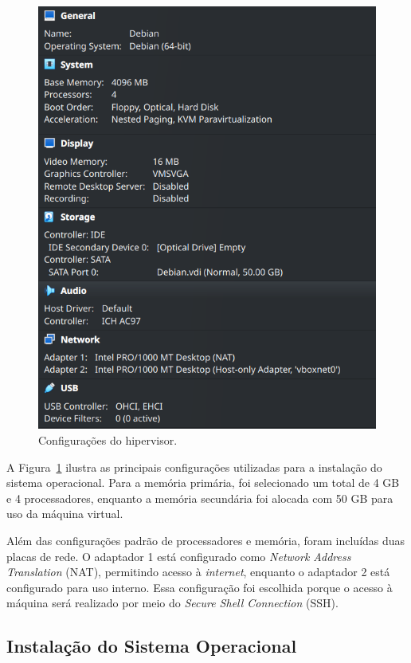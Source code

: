 \documentclass[
	12pt,				%
	oneside,   	        %
	a4paper,			%
	english,			%
	french,				%
	spanish,			%
	brazil,				%
	]{pacotes/abntex2}
\begin{document}
\begin{figure}[H]
  \centering
  \includegraphics[scale=0.7]{figuras/vm.png}
  \caption{Configurações do hipervisor.}
  \label{fig:vm}
\end{figure}

A Figura~\ref{fig:vm} ilustra as principais configurações utilizadas para a instalação do sistema operacional. Para a memória primária, foi selecionado um total de 4 GB e 4 processadores, enquanto a memória secundária foi alocada com 50 GB para uso da máquina virtual.

Além das configurações padrão de processadores e memória, foram incluídas duas placas de rede. O adaptador 1 está configurado como \textit{Network Address Translation} (NAT), permitindo acesso à \textit{internet}, enquanto o adaptador 2 está configurado para uso interno. Essa configuração foi escolhida porque o acesso à máquina será realizado por meio do \textit{Secure Shell Connection} (SSH).

\subsection{Instalação do Sistema Operacional}
\label{subsec:instalacao}
\end{document}
